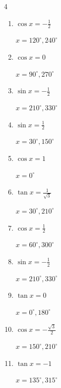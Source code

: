 \begin{multicols}{4}
\begin{enumerate}
        $\displaystyle x = 120^{\circ} , 300^{\circ}$

  \item $\displaystyle \cos{x}  = -\frac{1}{2}$

        $\displaystyle x = 120^{\circ} , 240^{\circ}$

  \item $\displaystyle \cos{x}  = 0$

        $\displaystyle x = 90^{\circ} , 270^{\circ}$

\columnbreak %

\resetques

  \item $\displaystyle \sin{x}  = -\frac{1}{2}$

        $\displaystyle x = 210^{\circ} , 330^{\circ}$

  \item $\displaystyle \sin{x}  = \frac{1}{2}$

        $\displaystyle x = 30^{\circ} , 150^{\circ}$

  \item $\displaystyle \cos{x}  = 1$

        $\displaystyle x = 0^{\circ}$

  \item $\displaystyle \tan{x}  = \frac{1}{\sqrt{3}}$

        $\displaystyle x = 30^{\circ} , 210^{\circ}$

  \item $\displaystyle \cos{x}  = \frac{1}{2}$

        $\displaystyle x = 60^{\circ} , 300^{\circ}$

  \item $\displaystyle \sin{x}  = -\frac{1}{2}$

        $\displaystyle x = 210^{\circ} , 330^{\circ}$

  \item $\displaystyle \tan{x}  = 0$

        $\displaystyle x = 0^{\circ} , 180^{\circ}$

  \item $\displaystyle \cos{x}  = -\frac{\sqrt{3}}{2}$

        $\displaystyle x = 150^{\circ} , 210^{\circ}$

  \item $\displaystyle \tan{x}  = -1$

        $\displaystyle x = 135^{\circ} , 315^{\circ}$


\end{enumerate}
\end{multicols}
